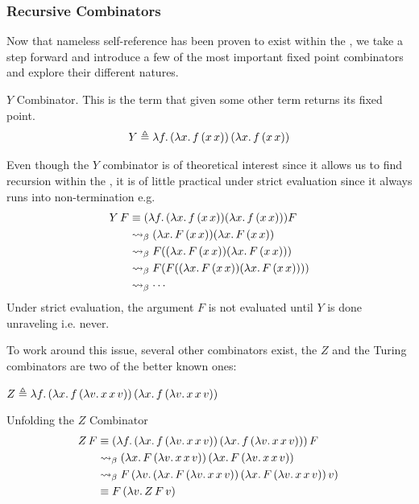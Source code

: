 \subsubsection{\centering Recursive Combinators}
Now that nameless self-reference has been proven to exist within the \lcalc, we take a step forward and introduce a few of the most important fixed point combinators and explore their different natures.
\begin{definition} $Y$ Combinator. This is the term that given some other term returns its fixed point.
\[
  Y \triangleq \lambda f.\, (\lambda x.\, f\, (x\, x))\, (\lambda x.\, f\, (x\, x))
\]
\end{definition}
\begin{remark}
  Even though the $Y$ combinator is of theoretical interest since it allows us to find recursion within the \lcalc, it is of little practical under strict evaluation since it always runs into non-termination e.g.
  \[
    \begin{aligned}
      Y \, F &\equiv (\lambda f. \, (\lambda x . \, f \, (x \, x))(\lambda x . \, f \, (x \, x))) F \\
      &\mathrel{\leadsto}_\beta (\lambda x . \, F \, (x \, x))(\lambda x . \, F \, (x \, x)) \\
             &\mathrel{\leadsto}_\beta F((\lambda x . \, F \, (x \, x))(\lambda x . \, F \, (x \, x))) \\
             &\mathrel{\leadsto}_\beta F(F((\lambda x . \, F \, (x \, x))(\lambda x . \, F \, (x \, x)))) \\
             &\mathrel{\leadsto}_\beta \cdots
    \end{aligned}
  \]
  Under strict evaluation, the argument $F$ is not evaluated until $Y$ is done unraveling i.e. never.
\end{remark}
To work around this issue, several other combinators exist, the $Z$ and the Turing combinators are two of the better known ones:
\begin{definition} \( Z \triangleq \lambda f.\, (\lambda x.\, f\, (\lambda v.\, x\, x\, v))\, (\lambda x.\, f\, (\lambda v.\, x\, x\, v)) \)
\end{definition}
\begin{example} Unfolding the $Z$ Combinator
  \[
    \begin{aligned}
      Z \, F &\equiv (\lambda f.\, (\lambda x.\, f\, (\lambda v.\, x\, x\, v))\, (\lambda x.\, f\, (\lambda v.\, x\, x\, v)))\, F \\
             &\mathrel{\leadsto}_\beta (\lambda x.\, F\, (\lambda v.\, x\, x\, v))\, (\lambda x.\, F\, (\lambda v.\, x\, x\, v)) \\
             &\mathrel{\leadsto}_\beta F\, (\lambda v.\, (\lambda x.\, F\, (\lambda v.\, x\, x\, v))\, (\lambda x.\, F\, (\lambda v.\, x\, x\, v))\, v)\, \\
             &\equiv F\, (\lambda v.\, Z \, F \, v)\, \\
    \end{aligned}
  \]
\end{example}
